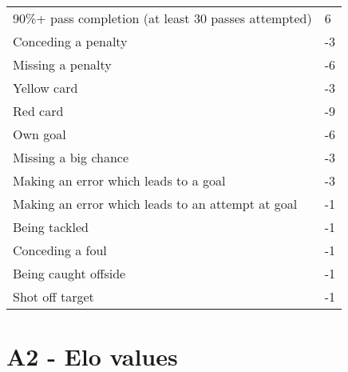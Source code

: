 \begin{table}[H]
\begin{tabular}{|l|l|}
90\%+ pass completion (at least 30 passes attempted)                     & 6   \\
Conceding a penalty                                                      & -3  \\
Missing a penalty                                                        & -6  \\
Yellow card                                                              & -3  \\
Red card                                                                 & -9  \\
Own goal                                                                 & -6  \\
Missing a big chance                                                     & -3  \\
Making an error which leads to a goal                                    & -3  \\
Making an error which leads to an attempt at goal                        & -1  \\
Being tackled                                                            & -1  \\
Conceding a foul                                                         & -1  \\
Being caught offside                                                     & -1  \\
Shot off target                                                          & -1 \\
\hline
\end{tabular}
\end{table}


\section{A2 - Elo values}


